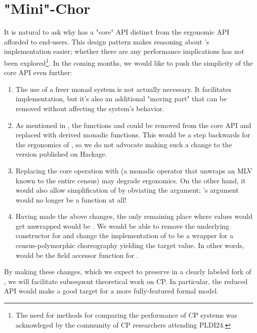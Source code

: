 \section{"Mini"-Chor}
\label{sec:future-implementation}
It is natural to ask why \MultiChor has a "core" API distinct from the ergonomic API afforded to end-users.
This design pattern makes reasoning about \MultiChor's implementation easier;
whether there are any performance implications has not been explored\footnote{
  The need for methods for comparing the performance of CP systems was acknowleged by the community
  of CP researchers attending PLDI24.
}.
In the coming months, we would like to push the simplicity of the core API even further:
\begin{enumerate}
  \item The use of a freer monad system is not actually necessary.
        It facilitates implementation, but it's also an additional "moving part" that can be removed
        without affecting the system's behavior.
\item As mentioned in , the functions  and 
        could be removed from the core API and replaced with derived monadic functions.
        This would be a step backwards for the ergonomics of \MultiChor,
        so we do not advocate making such a change to the version published on Hackage.
  \item Replacing the core operation  with 
        (a monadic operator that unwraps an MLV known to the entire census)
        may degrade ergonomics.
        On the other hand, it would also allow simplification of 
        by obviating the  argument;
        \ie {}'s argument would no longer be a function at all!
  \item Having made the above changes, the only remaining place where  values would get unwrapped
        would be .
        We would be able to remove the underlying  constructor for 
        and change the implementation of  to be a  wrapper for
        a census-polymorphic choreography yielding the target value.
        In other words,  would be the field accessor function for .
\end{enumerate}

By making these changes, which we expect to preserve in a clearly labeled fork of \MultiChor,
we will facilitate subsequent theoretical work on CP.
In particular, the reduced API would make a good target for a more fully-featured formal model.

